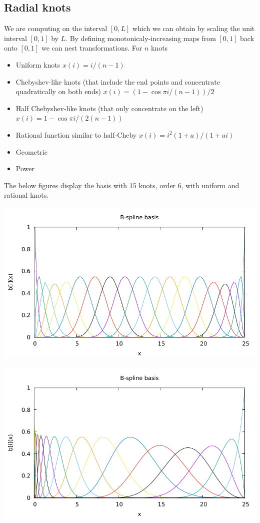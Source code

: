 \documentclass[12pt]{article}
\begin{document}
\subsection{Radial knots}

We are computing on the interval $[0,L]$ which we can obtain by scaling the unit interval $[0,1]$ by $L$.  By defining monotonicaly-increasing maps from $[0,1]$ back onto $[0,1]$ we can nest transformations.    For $n$ knots
\begin{itemize}
\item Uniform knots $x(i) = i/(n-1)$
\item Chebyshev-like knots (that include the end points and concentrate quadratically on both ends) $x(i) = (1-\cos \pi i / (n-1))/2$
\item Half Chebyshev-like knots (that only concentrate on the left) $x(i) = 1 - \cos \pi i / (2(n-1))$
\item Rational function similar to half-Cheby $x(i) = i^2 (1+a) / (1 + ai)$
\item Geometric
\item Power
\end{itemize}

The below figures display the basis with 15 knots, order 6, with uniform and rational knots.

\includegraphics[width=.9\linewidth]{basis.pdf}

\includegraphics[width=.9\linewidth]{basis-non-uni.pdf}
\end{document}
